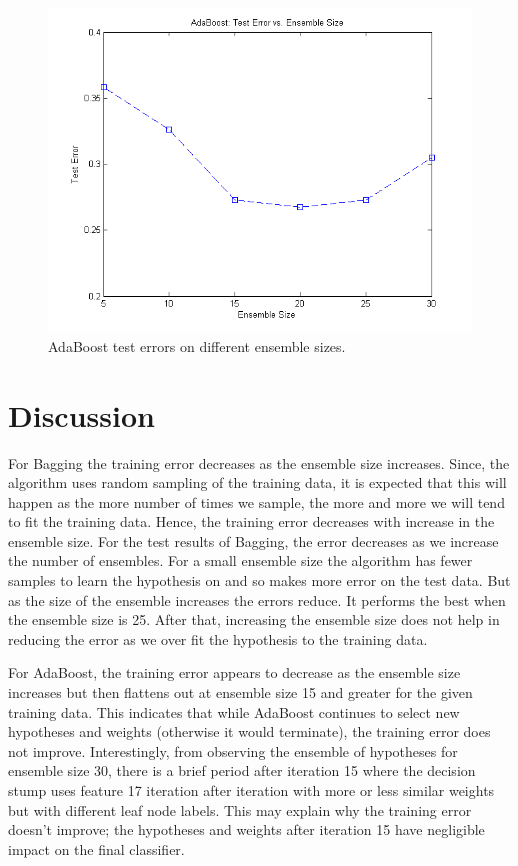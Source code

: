 \documentclass[12pt]{article}
\begin{document}
\begin{figure}[!t]
  \centering
  \includegraphics[scale=.75]{img/adaboost_testerrors.png}
  \caption{AdaBoost test errors on different ensemble sizes.}
  \label{fig:adaboost_testerrors}
\end{figure}

\section{Discussion}

For Bagging the training error decreases as the ensemble size increases. Since, the algorithm uses random sampling of the training data, it is expected that this will happen as the more number of times we sample, the more and more we will tend to fit the training data. Hence, the training error decreases with increase in the ensemble size.
For the test results of Bagging, the error decreases as we increase the number of ensembles. For a small ensemble size the algorithm has fewer samples to learn the hypothesis on and so makes more error on the test data. But as the size of the ensemble increases the errors reduce. It performs the best when the ensemble size is 25. After that, increasing the ensemble size does not help in reducing the error as we over fit the hypothesis to the training data.


For AdaBoost, the training error appears to decrease as the ensemble size increases but then flattens out at ensemble size 15 and greater for the given training data. This indicates that while AdaBoost continues to select new hypotheses and weights (otherwise it would terminate), the training error does not improve. Interestingly, from observing the ensemble of hypotheses for ensemble size 30, there is a brief period after iteration 15 where the decision stump uses feature 17 iteration after iteration with more or less similar weights but with different leaf node labels. This may explain why the training error doesn't improve; the hypotheses and weights after iteration 15 have negligible impact on the final classifier.
\end{document}
